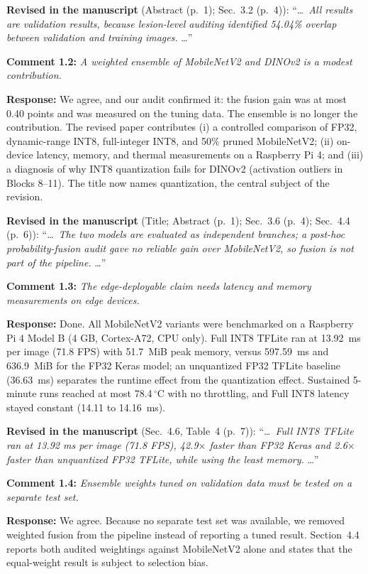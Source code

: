 \documentclass[11pt,a4paper]{article}
\begin{document}
\textbf{Revised in the manuscript} (Abstract (p.~1); Sec.~3.2 (p.~4)): ``\ldots\ \emph{All results are validation results, because lesion-level auditing identified 54.04\% overlap between validation and training images.} \ldots''

\medskip
\textbf{Comment 1.2:} \emph{A weighted ensemble of MobileNetV2 and DINOv2 is a modest contribution.}

\textbf{Response:} We agree, and our audit confirmed it: the fusion gain was at most 0.40 points and was measured on the tuning data. The ensemble is no longer the contribution. The revised paper contributes (i) a controlled comparison of FP32, dynamic-range INT8, full-integer INT8, and 50\% pruned MobileNetV2; (ii) on-device latency, memory, and thermal measurements on a Raspberry Pi 4; and (iii) a diagnosis of why INT8 quantization fails for DINOv2 (activation outliers in Blocks 8--11). The title now names quantization, the central subject of the revision.

\textbf{Revised in the manuscript} (Title; Abstract (p.~1); Sec.~3.6 (p.~4); Sec.~4.4 (p.~6)): ``\ldots\ \emph{The two models are evaluated as independent branches; a post-hoc probability-fusion audit gave no reliable gain over MobileNetV2, so fusion is not part of the pipeline.} \ldots''

\medskip
\textbf{Comment 1.3:} \emph{The edge-deployable claim needs latency and memory measurements on edge devices.}

\textbf{Response:} Done. All MobileNetV2 variants were benchmarked on a Raspberry Pi 4 Model B (4 GB, Cortex-A72, CPU only). Full INT8 TFLite ran at 13.92~ms per image (71.8 FPS) with 51.7~MiB peak memory, versus 597.59~ms and 636.9~MiB for the FP32 Keras model; an unquantized FP32 TFLite baseline (36.63~ms) separates the runtime effect from the quantization effect. Sustained 5-minute runs reached at most 78.4\,$^\circ$C with no throttling, and Full INT8 latency stayed constant (14.11 to 14.16~ms).

\textbf{Revised in the manuscript} (Sec.~4.6, Table~4 (p.~7)): ``\ldots\ \emph{Full INT8 TFLite ran at 13.92 ms per image (71.8 FPS), 42.9$\times$ faster than FP32 Keras and 2.6$\times$ faster than unquantized FP32 TFLite, while using the least memory.} \ldots''

\medskip
\textbf{Comment 1.4:} \emph{Ensemble weights tuned on validation data must be tested on a separate test set.}

\textbf{Response:} We agree. Because no separate test set was available, we removed weighted fusion from the pipeline instead of reporting a tuned result. Section~4.4 reports both audited weightings against MobileNetV2 alone and states that the equal-weight result is subject to selection bias.
\end{document}

